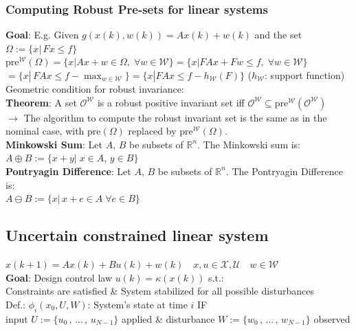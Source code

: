 \subsubsection{Computing Robust Pre-sets for linear systems}
\textbf{Goal}: E.g. Given $g(x(k),w(k))=Ax(k)+w(k)$ and the set $\Omega:=\{x|\,Fx\leq f\}$\\
$\text{pre}^\mathcal{W}(\Omega)=\{x|Ax+w\in\Omega,\;\forall w\in\mathcal{W}\}=\{x|FAx+Fw\leq f,\;\forall w\in\mathcal{W}\}$\\
$=\{x|\,FAx\leq f-\max_{w\in\mathcal{W}}\}=\{x|FAx\leq f-h_\mathcal{W}(F)\}$ ($h_\mathcal{W}$: support function)\\
Geometric condition for robust invariance:\\
\textbf{Theorem}: A set $\mathcal{O}^\mathcal{W}$ is a robust positive invariant set iff $\mathcal{O}^\mathcal{W}\subseteq\text{pre}^\mathcal{W}(\mathcal{O}^\mathcal{W})$\\
$\rightarrow$ The algorithm to compute the robust invariant set is the same as in the nominal case, with $\text{pre}(\Omega)$ replaced by $\text{pre}^{\mathcal{W}}(\Omega)$.\\
\textbf{Minkowski Sum}: Let $A,\,B$ be subsets of $\mathbb{R}^n$.
The Minkowski sum is:\\
$A\oplus B:=\{x+y|\;x\in A,\,y\in B\}$\\
\textbf{Pontryagin Difference}: Let $A,\,B$ be subsets of $\mathbb{R}^n$. The Pontryagin Difference is:\\
$A\ominus B:=\{x|\,x+e\in A\;\forall e\in B\}$\\


\subsection{Uncertain constrained linear system}
$x(k+1)=Ax(k)+Bu(k)+w(k)\quad x,u\in\mathcal{X,\mathcal{U}}\quad w\in\mathcal{W}$\\
\textbf{Goal}: Design control law $u(k)=\kappa(x(k))$ s.t.:\\
\rightarrow Constraints are satisfied \& System stabilized for all possible disturbances\\
Def.: $\phi_i(x_0,U,W)$: System's state at time $i$ IF\\
\rightarrow input $U:=\{u_0\,,\,...\,,\,u_{N-1}\}$ applied \& disturbance $W:=\{w_0\,,\,...\,,\,w_{N-1}\}$ observed

